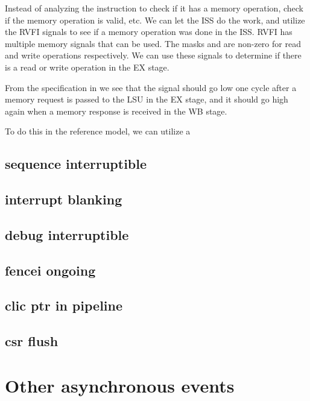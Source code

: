 Instead of analyzing the instruction to check if it has a memory operation, check if the memory operation is valid, etc. We can let the ISS do the work, and utilize the RVFI signals to see if a memory operation was done in the ISS. RVFI has multiple memory signals that can be used. The masks  and  are non-zero for read and write operations respectively. We can use these signals to determine if there is a read or write operation in the EX stage.

From the specification in  we see that the  signal should go low one cycle after a memory request is passed to the LSU in the EX stage, and it should go high again when a memory response is received in the WB stage. 

To do this in the reference model, we can utilize a  


\subsection{sequence interruptible}

\subsection{interrupt blanking}

\subsection{debug interruptible}
\subsection{fencei ongoing}
\subsection{clic ptr in pipeline}
\subsection{csr flush }






\section{Other asynchronous events}

